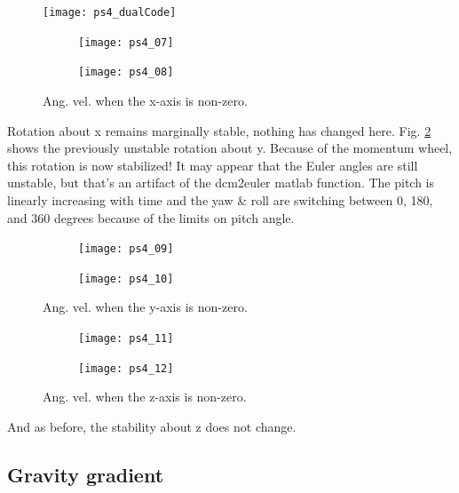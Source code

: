 \documentclass[12pt, letterpaper]{article}
\begin{document}
\begin{figure}[H]
	\centering
	\texttt{[image: ps4\_dualCode]}
\end{figure}

\begin{figure}[H]
	\centering
	\begin{subfigure}[b]{0.49\textwidth}
		\texttt{[image: ps4\_07]}
	\end{subfigure}
	\begin{subfigure}[b]{0.49\textwidth}
		\texttt{[image: ps4\_08]}
	\end{subfigure}
	\caption{Ang. vel. when the x-axis is non-zero.}
	\label{(4:x2)}
\end{figure}

Rotation about x remains marginally stable, nothing has changed here. Fig. \ref{(4:y2)} shows the previously unstable rotation about y. Because of the momentum wheel, this rotation is now stabilized! It may appear that the Euler angles are still unstable, but that's an artifact of the dcm2euler matlab function. The pitch is linearly increasing with time and the yaw \& roll are switching between 0, 180, and 360 degrees because of the limits on pitch angle.


\begin{figure}[H]
	\centering
	\begin{subfigure}[b]{0.49\textwidth}
		\texttt{[image: ps4\_09]}
	\end{subfigure}
	\begin{subfigure}[b]{0.49\textwidth}
		\texttt{[image: ps4\_10]}
	\end{subfigure}
	\caption{Ang. vel. when the y-axis is non-zero.}
	\label{(4:y2)}
\end{figure}


\begin{figure}[H]
	\centering
	\begin{subfigure}[b]{0.49\textwidth}
		\texttt{[image: ps4\_11]}
	\end{subfigure}
	\begin{subfigure}[b]{0.49\textwidth}
		\texttt{[image: ps4\_12]}
	\end{subfigure}
	\caption{Ang. vel. when the z-axis is non-zero.}
	\label{(4:z2)}
\end{figure}

And as before, the stability about z does not change.


\subsection{Gravity gradient}
\end{document}
